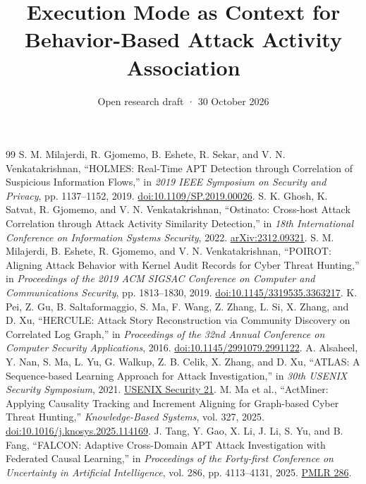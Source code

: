 \documentclass[10pt]{article}
\title{Execution Mode as Context for Behavior-Based Attack Activity Association}
\author{}
\date{Open research draft · 30 October 2026}
\begin{document}
\maketitle

\appendix

\begin{thebibliography}{99}
 S. M. Milajerdi, R. Gjomemo, B. Eshete, R. Sekar, and V. N. Venkatakrishnan, ``HOLMES: Real-Time APT Detection through Correlation of Suspicious Information Flows,'' in \emph{2019 IEEE Symposium on Security and Privacy}, pp. 1137--1152, 2019. \href{https://doi.org/10.1109/SP.2019.00026}{doi:10.1109/SP.2019.00026}.
 S. K. Ghosh, K. Satvat, R. Gjomemo, and V. N. Venkatakrishnan, ``Ostinato: Cross-host Attack Correlation through Attack Activity Similarity Detection,'' in \emph{18th International Conference on Information Systems Security}, 2022. \href{https://arxiv.org/abs/2312.09321}{arXiv:2312.09321}.
 S. M. Milajerdi, B. Eshete, R. Gjomemo, and V. N. Venkatakrishnan, ``POIROT: Aligning Attack Behavior with Kernel Audit Records for Cyber Threat Hunting,'' in \emph{Proceedings of the 2019 ACM SIGSAC Conference on Computer and Communications Security}, pp. 1813--1830, 2019. \href{https://doi.org/10.1145/3319535.3363217}{doi:10.1145/3319535.3363217}.
 K. Pei, Z. Gu, B. Saltaformaggio, S. Ma, F. Wang, Z. Zhang, L. Si, X. Zhang, and D. Xu, ``HERCULE: Attack Story Reconstruction via Community Discovery on Correlated Log Graph,'' in \emph{Proceedings of the 32nd Annual Conference on Computer Security Applications}, 2016. \href{https://doi.org/10.1145/2991079.2991122}{doi:10.1145/2991079.2991122}.
 A. Alsaheel, Y. Nan, S. Ma, L. Yu, G. Walkup, Z. B. Celik, X. Zhang, and D. Xu, ``ATLAS: A Sequence-based Learning Approach for Attack Investigation,'' in \emph{30th USENIX Security Symposium}, 2021. \href{https://www.usenix.org/conference/usenixsecurity21/presentation/alsaheel}{USENIX Security 21}.
 M. Ma et al., ``ActMiner: Applying Causality Tracking and Increment Aligning for Graph-based Cyber Threat Hunting,'' \emph{Knowledge-Based Systems}, vol. 327, 2025. \href{https://doi.org/10.1016/j.knosys.2025.114169}{doi:10.1016/j.knosys.2025.114169}.
 J. Tang, Y. Gao, X. Li, J. Li, S. Yu, and B. Fang, ``FALCON: Adaptive Cross-Domain APT Attack Investigation with Federated Causal Learning,'' in \emph{Proceedings of the Forty-first Conference on Uncertainty in Artificial Intelligence}, vol. 286, pp. 4113--4131, 2025. \href{https://proceedings.mlr.press/v286/tang25a.html}{PMLR 286}.

\end{thebibliography}
\end{document}
